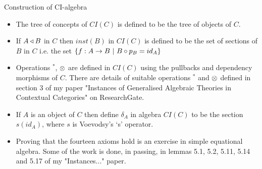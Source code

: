 \begin{frame}{Construction of CI-algebra}
\begin{itemize}
\item The tree of concepts of $CI(C)$ is defined to be the tree of objects of $C$.

\item If $A \triangleleft B$ in $C$ then $inst(B)$ in $CI(C)$ is defined to be the set of sections of
 $B$ in $C$ i.e. the set $\left\{f: A \rightarrow B \ \middle|\ B \circ p_B = id_A\right\}$

\item Operations $^*$, $\otimes$ are defined in $CI(C)$ using the pullbacks and dependency morphisms of $C$.  
 There are details of suitable  operations $^*$ and $\otimes$ defined in section 3 of my paper
 "Instances of Generalised Algebraic Theories in Contextual Categories" on ResearchGate.
 \item If $A$ is an object of $C$ then define $\delta_A$ in algebra $CI(C)$ to be the section
 $s(id_A)$, where $s$ is Voevodsy's `s' operator.
 \item Proving that the fourteen axioms hold is an exercise in simple equational algebra. Some of the work is done, in passing, in lemmas 5.1, 5.2, 5.11, 5.14 and 5.17 of my "Instances..." paper.
\end{itemize}
\end{frame}
